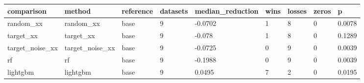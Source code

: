 \begin{tabular}{lllllllll}
\toprule
comparison & method & reference & datasets & median\_reduction & wins & losses & zeros & p \\
\midrule
random\_xx & random\_xx & base & 9 & -0.0702 & 1 & 8 & 0 & 0.0078 \\
target\_xx & target\_xx & base & 9 & -0.078 & 1 & 8 & 0 & 0.1289 \\
target\_noise\_xx & target\_noise\_xx & base & 9 & -0.0725 & 0 & 9 & 0 & 0.0039 \\
rf & rf & base & 9 & -0.1988 & 0 & 9 & 0 & 0.0039 \\
lightgbm & lightgbm & base & 9 & 0.0495 & 7 & 2 & 0 & 0.0195 \\
\bottomrule
\end{tabular}
